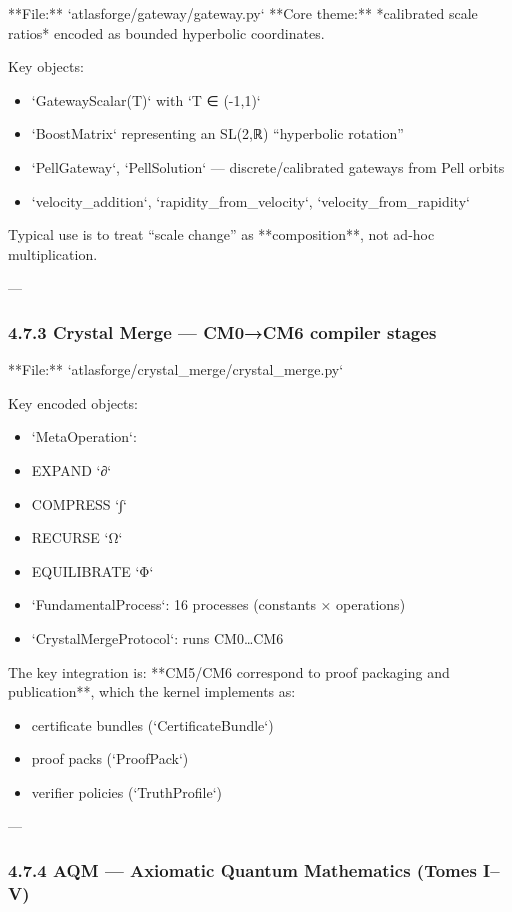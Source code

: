 \documentclass[11pt]{article}
\begin{document}
**File:** `atlasforge/gateway/gateway.py`  
**Core theme:** *calibrated scale ratios* encoded as bounded hyperbolic coordinates.

Key objects:
\begin{itemize}
\item `GatewayScalar(T)` with `T ∈ (-1,1)`
\item `BoostMatrix` representing an SL(2,ℝ) “hyperbolic rotation”
\item `PellGateway`, `PellSolution` — discrete/calibrated gateways from Pell orbits
\item `velocity\_addition`, `rapidity\_from\_velocity`, `velocity\_from\_rapidity`
\end{itemize}

Typical use is to treat “scale change” as **composition**, not ad-hoc multiplication.

---

\subsubsection{4.7.3 Crystal Merge — CM0→CM6 compiler stages}

**File:** `atlasforge/crystal\_merge/crystal\_merge.py`

Key encoded objects:
\begin{itemize}
\item `MetaOperation`:
\item EXPAND `∂`
\item COMPRESS `∫`
\item RECURSE `Ω`
\item EQUILIBRATE `Φ`
\item `FundamentalProcess`: 16 processes (constants × operations)
\item `CrystalMergeProtocol`: runs CM0…CM6
\end{itemize}

The key integration is: **CM5/CM6 correspond to proof packaging and publication**, which the kernel implements as:
\begin{itemize}
\item certificate bundles (`CertificateBundle`)
\item proof packs (`ProofPack`)
\item verifier policies (`TruthProfile`)
\end{itemize}

---

\subsubsection{4.7.4 AQM — Axiomatic Quantum Mathematics (Tomes I–V)}
\end{document}
